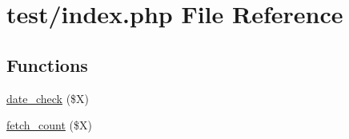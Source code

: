 \hypertarget{index_8php}{\section{test/index.php \-File \-Reference}
\label{index_8php}
}
\subsection*{\-Functions}
\begin{DoxyCompactItemize}
\item 
\hyperlink{index_8php_a00398fc736dcefa3b57280ce1cdbf438}{date\-\_\-check} (\$\-X)
\item 
\hyperlink{index_8php_ab37d59932fd6526f337d009f44f5ab2e}{fetch\-\_\-count} (\$\-X)
\end{DoxyCompactItemize}

